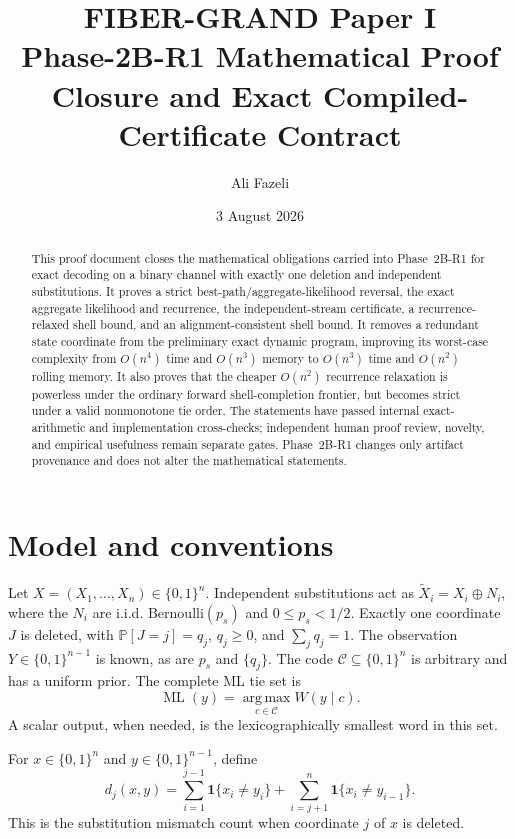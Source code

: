 \documentclass[11pt]{article}
\title{FIBER-GRAND Paper I\\Phase-2B-R1 Mathematical Proof Closure and Exact Compiled-Certificate Contract}
\author{Ali Fazeli}
\date{3 August 2026}
\theoremstyle{remark}
\newcommand{\C}{\mathcal C}
\newcommand{\ind}{\mathbf 1}
\newcommand{\Prb}{\mathbb P}
\newcommand{\argmax}{\operatorname*{arg\,max}}
\begin{document}
\maketitle

\begin{abstract}
This proof document closes the mathematical obligations carried into Phase~2B-R1 for exact decoding on a binary channel with exactly one deletion
and independent substitutions. It proves a strict best-path/aggregate-likelihood
reversal, the exact aggregate likelihood and recurrence, the independent-stream
certificate, a recurrence-relaxed shell bound, and an alignment-consistent shell bound.
It removes a redundant state coordinate from the preliminary exact dynamic program,
improving its worst-case complexity from $O(n^4)$ time and $O(n^3)$ memory to $O(n^3)$
time and $O(n^2)$ rolling memory. It also proves that the cheaper $O(n^2)$ recurrence
relaxation is powerless under the ordinary forward shell-completion frontier, but becomes
strict under a valid nonmonotone tie order. The statements have passed internal exact-arithmetic and implementation cross-checks; independent human proof review, novelty, and empirical usefulness remain separate gates. Phase~2B-R1 changes only artifact provenance and does not alter the mathematical statements.
\end{abstract}

\section{Model and conventions}

Let $X=(X_1,\ldots,X_n)\in\{0,1\}^n$. Independent substitutions act as
$\widetilde X_i=X_i\oplus N_i$, where the $N_i$ are i.i.d. Bernoulli$(p_s)$ and
$0\le p_s<1/2$. Exactly one coordinate $J$ is deleted, with
$\Prb[J=j]=q_j$, $q_j\ge0$, and $\sum_jq_j=1$. The observation
$Y\in\{0,1\}^{n-1}$ is known, as are $p_s$ and $\{q_j\}$. The code
$\C\subseteq\{0,1\}^n$ is arbitrary and has a uniform prior. The complete ML tie set is
\[
 \operatorname{ML}(y)=\argmax_{c\in\C}W(y\mid c).
\]
A scalar output, when needed, is the lexicographically smallest word in this set.

For $x\in\{0,1\}^n$ and $y\in\{0,1\}^{n-1}$, define
\begin{equation}
 d_j(x,y)=\sum_{i=1}^{j-1}\ind\{x_i\ne y_i\}
 +\sum_{i=j+1}^{n}\ind\{x_i\ne y_{i-1}\}.
 \label{eq:dj}
\end{equation}
This is the substitution mismatch count when coordinate $j$ of $x$ is deleted.
\end{document}
